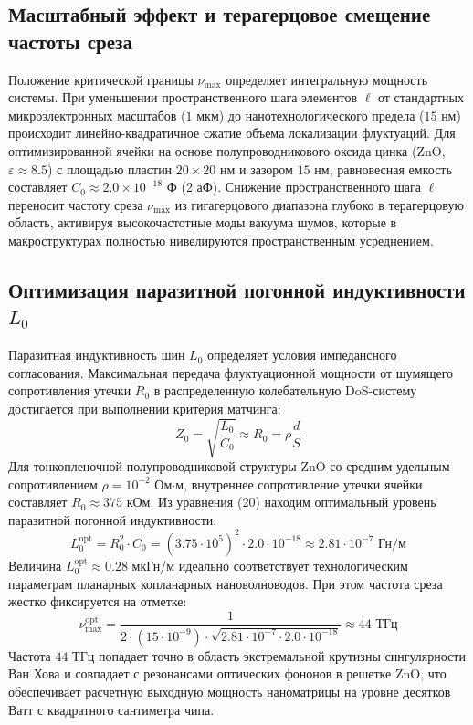 \documentclass[12pt,a4paper]{article}
\begin{document}
\subsection{Масштабный эффект и терагерцовое смещение частоты среза}
Положение критической границы $\nu_{\text{max}}$ определяет интегральную мощность системы. При уменьшении пространственного шага элементов $\ell$ от стандартных микроэлектронных масштабов ($1$ мкм) до нанотехнологического предела ($15$ нм) происходит линейно-квадратичное сжатие объема локализации флуктуаций.
Для оптимизированной ячейки на основе полупроводникового оксида цинка ($\text{ZnO}$, $\varepsilon \approx 8.5$) с площадью пластин $20 \times 20$ нм и зазором $15$ нм, равновесная емкость составляет $C_0 \approx 2.0 \times 10^{-18}$ Ф (2 аФ). Снижение пространственного шага $\ell$ переносит частоту среза $\nu_{\text{max}}$ из гигагерцового диапазона глубоко в терагерцовую область, активируя высокочастотные моды вакуума шумов, которые в макроструктурах полностью нивелируются пространственным усреднением.
\subsection{Оптимизация паразитной погонной индуктивности $L_0$}
Паразитная индуктивность шин $L_0$ определяет условия импедансного согласования. Максимальная передача флуктуационной мощности от шумящего сопротивления утечки $R_0$ в распределенную колебательную DoS-систему достигается при выполнении критерия матчинга:
\begin{equation}
Z_0 = \sqrt{\frac{L_0}{C_0}} \approx R_0 = \rho \frac{d}{S}
\end{equation}
Для тонкопленочной полупроводниковой структуры $\text{ZnO}$ со средним удельным сопротивлением $\rho = 10^{-2}$ Ом$\cdot$м, внутреннее сопротивление утечки ячейки составляет $R_0 \approx 375$ кОм. Из уравнения (20) находим оптимальный уровень паразитной погонной индуктивности:
\begin{equation}
L_0^{\text{opt}} = R_0^2 \cdot C_0 = (3.75 \cdot 10^5)^2 \cdot 2.0 \cdot 10^{-18} \approx 2.81 \cdot 10^{-7} \text{ Гн/м}
\end{equation}
Величина $L_0^{\text{opt}} \approx 0.28$ мкГн/м идеально соответствует технологическим параметрам планарных копланарных нановолноводов. При этом частота среза жестко фиксируется на отметке:
\begin{equation}
\nu_{\text{max}}^{\text{opt}} = \frac{1}{2 \cdot (15 \cdot 10^{-9}) \cdot \sqrt{2.81 \cdot 10^{-7} \cdot 2.0 \cdot 10^{-18}}} \approx 44 \text{ ТГц}
\end{equation}
Частота $44$ ТГц попадает точно в область экстремальной крутизны сингулярности Ван Хова и совпадает с резонансами оптических фононов в решетке $\text{ZnO}$, что обеспечивает расчетную выходную мощность наноматрицы на уровне десятков Ватт с квадратного сантиметра чипа.
\end{document}
